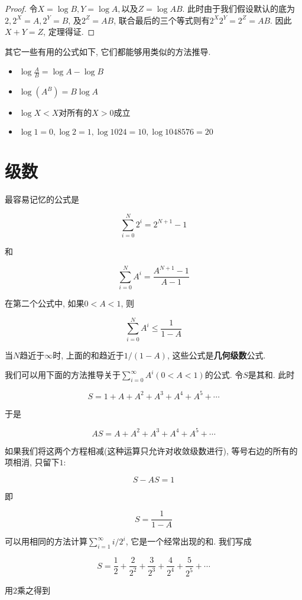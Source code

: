 \documentclass[oneside,10pt,fontset=none]{ctexbook}
\numberwithin{definition}{chapter}
\numberwithin{theorem}{chapter}
\newtheorem{proof}{证明}
\numberwithin{proof}{chapter}
\begin{document}
\begin{proof}
    令$X=\log{B}, Y=\log{A}, \text{以及}Z=\log{AB}$. 此时由于我们假设默认的底为$2, 2^X=A, 2^Y = B$, 及$2^Z=AB$, 联合最后的三个等式则有$2^X2^Y=2^Z=AB$. 因此$X+Y=Z$, 定理得证.
\end{proof}

其它一些有用的公式如下, 它们都能够用类似的方法推导.

\begin{itemize}
    \item $\log{\frac{A}{B}} = \log{A} - \log{B}$
    \item $\log{(A^B)} = B\log{A}$
    \item $\log{X} < X \text{对所有的} X > 0 \text{成立}$
    \item $\log{1} = 0, \log{2}=1, \log{1024}=10, \log{1048576}=20$
\end{itemize}

\section{级数}

最容易记忆的公式是

$$
\sum_{i=0}^{N}2^i = 2^{N+1} - 1
$$

和

$$
\sum_{i=0}^{N}A^i = \frac{A^{N+1}-1}{A-1}
$$

在第二个公式中, 如果$0<A<1$, 则

$$
\sum_{i=0}^{N}A^i \le \frac{1}{1-A}
$$

当$N$趋近于$\infty$时, 上面的和趋近于$1/(1-A)$, 这些公式是\textbf{几何级数}公式.

我们可以用下面的方法推导关于$\sum_{i=0}^{\infty}A^i(0<A<1)$的公式. 令$S$是其和. 此时

$$
S=1+A+A^2+A^3+A^4+A^5+\cdots
$$

于是

$$
AS=A+A^2+A^3+A^4+A^5+\cdots
$$

如果我们将这两个方程相减(这种运算只允许对收敛级数进行), 等号右边的所有的项相消, 只留下$1$:

$$
S-AS=1
$$

即

$$
S=\frac{1}{1-A}
$$

可以用相同的方法计算$\sum_{i=1}^{\infty}i/2^i$, 它是一个经常出现的和. 我们写成

$$
S=\frac{1}{2}+\frac{2}{2^2}+\frac{3}{2^3}+\frac{4}{2^4}+\frac{5}{2^5}+\cdots
$$

用$2$乘之得到
\end{document}
